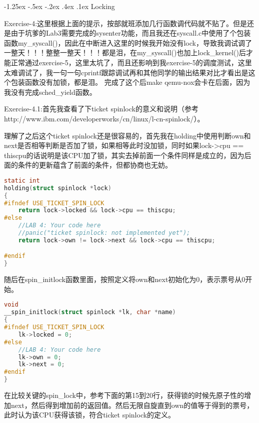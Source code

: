 \documentclass[11pt,a4paper]{article}
\makeatletter
\newcommand{\sihao}{\fontsize{14pt}{\baselineskip}\selectfont}
\renewcommand\subsection{\@startsection{subsection}{1}{\z@}%
{-1.25ex \@plus -.5ex \@minus -.2ex}%
{.4ex \@plus .1ex}%
{\normalfont\sihao\fontspec{黑体}}}
\makeatother
\begin{document}
\subsection{Locking}

\color{red}Exercise-4:\color{black}这里根据上面的提示，按部就班添加几行函数调代码就不贴了。但是还是由于坑爹的Lab3需要完成的sysenter功能，而且我还在syscall.c中使用了个包装函数my\_syscall()，因此在中断进入这里的时候我开始没有lock，导致我调试调了一整天！！！整整一整天！！！都是泪，在my\_syscall()也加上lock\_kernel()后才能正常通过exercise-5，这里太坑了，而且还影响到我exercise-5的调度测试，这里太难调试了，我一句一句cprintf跟踪调试再和其他同学的输出结果对比才看出是这个包装函数没有加锁，都是泪。
完成了这个后make qemu-nox会卡在后面，因为我没有完成sched\_yield函数。

\color{red}Exercise-4.1:\color{black}首先我查看了下ticket spinlock的意义和说明（参考http://www.ibm.com/developerworks/cn/linux/l-cn-spinlock/）。

理解了之后这个ticket spinlock还是很容易的，首先我在holding中使用判断own和next是否相等判断是否加了锁，如果相等此时没加锁，同时如果lock->cpu == thiscpu的话说明是该CPU加了锁，其实去掉前面一个条件同样是成立的，因为后面的条件的更新蕴含了前面的条件，但都协商也无妨。

\setmainfont{Consolas}
\begin{lstlisting}[language={C},firstnumber=1,title=kern/spinlock.c] 
static int
holding(struct spinlock *lock)
{
#ifndef USE_TICKET_SPIN_LOCK
	return lock->locked && lock->cpu == thiscpu;
#else
	//LAB 4: Your code here
	//panic("ticket spinlock: not implemented yet");
	return lock->own != lock->next && lock->cpu == thiscpu;

#endif
}
\end{lstlisting}
\setmainfont[BoldFont=黑体]{宋体}

随后在spin\_initlock函数里面，按照定义将own和next初始化为0，表示票号从0开始。

\setmainfont{Consolas}
\begin{lstlisting}[language={C},firstnumber=1,title=kern/spinlock.c] 
void
__spin_initlock(struct spinlock *lk, char *name)
{
#ifndef USE_TICKET_SPIN_LOCK
	lk->locked = 0;
#else
	//LAB 4: Your code here
	lk->own = 0;
	lk->next = 0;
#endif
}
\end{lstlisting}
\setmainfont[BoldFont=黑体]{宋体}

在比较关键的spin\_lock中，参考下面的第15到20行，获得锁的时候先原子性的增加next，然后得到增加前的返回值。然后无限自旋直到own的值等于得到的票号，此时认为该CPU获得该锁，符合ticket spinlock的定义。
\end{document}
